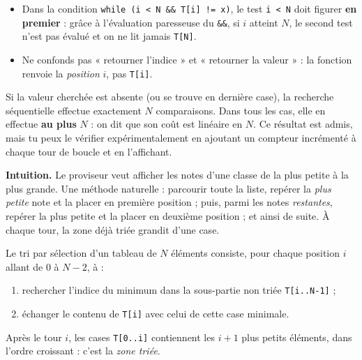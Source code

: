 \documentclass[11pt]{article}
\newcommand{\cle}[1]{{\popxbold\color{popdark}#1}}
\newcounter{popsec}
\newcounter{popsub}
\newcommand{\courssub}[1]{%
  \stepcounter{popsub}%
  \par\vspace{9pt}\noindent{\popxbold\fontsize{11.5}{13}\selectfont\color{popink}{\color{poporange}\thepopsec.\thepopsub}\hspace{6pt}#1}\par\nopagebreak\vspace{4pt}
}
\begin{document}
\begin{attention}
\begin{itemize}
\item Dans la condition \texttt{while (i < N \&\& T[i] != x)}, le test \texttt{i < N} doit figurer \textbf{en premier} : grâce à l'évaluation paresseuse du \texttt{\&\&}, si $i$ atteint $N$, le second test n'est pas évalué et on ne lit jamais \texttt{T[N]}.
\item Ne confonds pas « retourner l'indice » et « retourner la valeur » : la fonction renvoie la \emph{position} $i$, pas \texttt{T[i]}.
\end{itemize}
\end{attention}

\begin{propriete}
Si la valeur cherchée est absente (ou se trouve en dernière case), la recherche séquentielle effectue exactement $N$ comparaisons. Dans tous les cas, elle en effectue \textbf{au plus} $N$ : on dit que son coût est \cle{linéaire} en $N$. Ce résultat est admis, mais tu peux le vérifier expérimentalement en ajoutant un compteur incrémenté à chaque tour de boucle et en l'affichant.
\end{propriete}

\courssub{Le tri par sélection}

\textbf{Intuition.} Le proviseur veut afficher les notes d'une classe de la plus petite à la plus grande. Une méthode naturelle : parcourir toute la liste, repérer la \emph{plus petite} note et la placer en première position ; puis, parmi les notes \emph{restantes}, repérer la plus petite et la placer en deuxième position ; et ainsi de suite. À chaque tour, la zone déjà triée grandit d'une case.

\begin{definition}
Le \cle{tri par sélection} d'un tableau de $N$ éléments consiste, pour chaque position $i$ allant de $0$ à $N-2$, à :
\begin{enumerate}
\item rechercher l'\cle{indice du minimum} dans la sous-partie non triée \texttt{T[i..N-1]} ;
\item échanger le contenu de \texttt{T[i]} avec celui de cette case minimale.
\end{enumerate}
Après le tour $i$, les cases \texttt{T[0..i]} contiennent les $i+1$ plus petits éléments, dans l'ordre croissant : c'est la \emph{zone triée}.
\end{definition}
\end{document}

